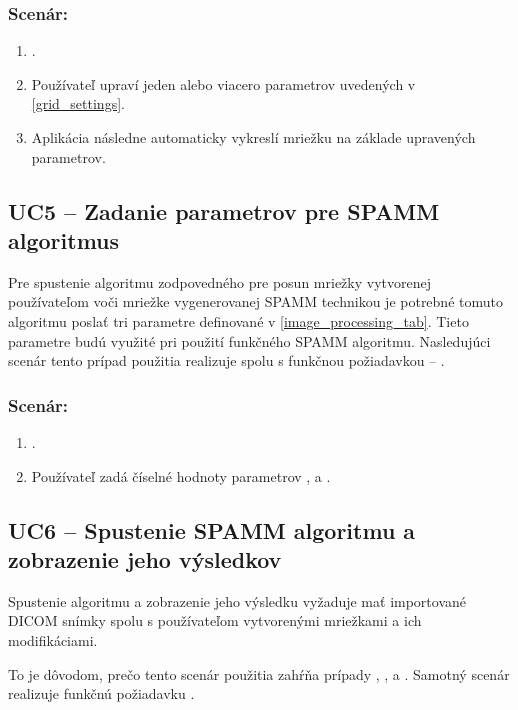 \subsubsection*{Scenár:}
\begin {enumerate}
\item {.}
\item {Používateľ upraví jeden alebo viacero parametrov uvedených v \ref{grid_settings}.}
\item {Aplikácia následne automaticky vykreslí mriežku na základe upravených parametrov.}
\end {enumerate}

\subsection {UC5 -- Zadanie parametrov pre SPAMM algoritmus}\label{uc5}
Pre spustenie algoritmu zodpovedného pre posun mriežky vytvorenej používateľom voči mriežke vygenerovanej SPAMM technikou je potrebné tomuto algoritmu poslať tri parametre definované v \ref{image_processing_tab}. Tieto parametre budú využité pri použití funkčného SPAMM algoritmu. Nasledujúci scenár tento prípad použitia realizuje spolu s funkčnou požiadavkou -- .

\subsubsection*{Scenár:}
\begin {enumerate}
\item {.}
\item {Používateľ zadá číselné hodnoty parametrov , \newline {} a .}
\end {enumerate}

\subsection {UC6 -- Spustenie SPAMM algoritmu a zobrazenie jeho výsledkov}\label{uc6}
Spustenie algoritmu a zobrazenie jeho výsledku vyžaduje mať importované DICOM snímky spolu s používateľom vytvorenými mriežkami a ich modifikáciami.

To je dôvodom, prečo tento scenár použitia zahŕňa prípady , ,  a . Samotný scenár realizuje funkčnú požiadavku .

\clearpage

